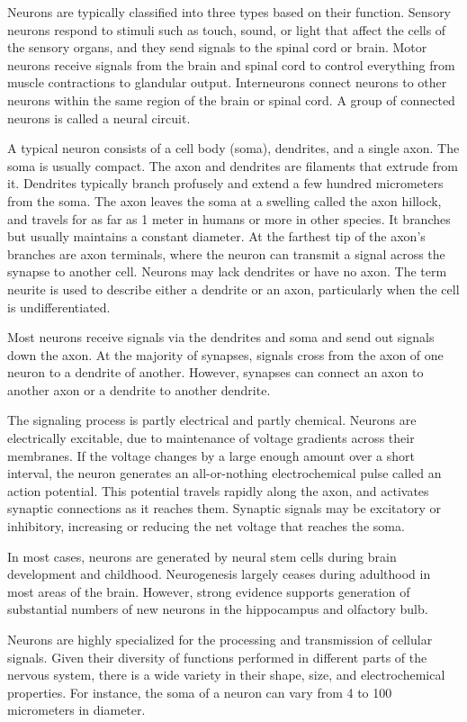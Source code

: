 Neurons are typically classified into three types based on their function. Sensory neurons respond to stimuli such as touch, sound, or light that affect the cells of the sensory organs, and they send signals to the spinal cord or brain. Motor neurons receive signals from the brain and spinal cord to control everything from muscle contractions to glandular output. Interneurons connect neurons to other neurons within the same region of the brain or spinal cord. A group of connected neurons is called a neural circuit.

A typical neuron consists of a cell body (soma), dendrites, and a single axon. The soma is usually compact. The axon and dendrites are filaments that extrude from it. Dendrites typically branch profusely and extend a few hundred micrometers from the soma. The axon leaves the soma at a swelling called the axon hillock, and travels for as far as 1 meter in humans or more in other species. It branches but usually maintains a constant diameter. At the farthest tip of the axon's branches are axon terminals, where the neuron can transmit a signal across the synapse to another cell. Neurons may lack dendrites or have no axon. The term neurite is used to describe either a dendrite or an axon, particularly when the cell is undifferentiated.

Most neurons receive signals via the dendrites and soma and send out signals down the axon. At the majority of synapses, signals cross from the axon of one neuron to a dendrite of another. However, synapses can connect an axon to another axon or a dendrite to another dendrite.

The signaling process is partly electrical and partly chemical. Neurons are electrically excitable, due to maintenance of voltage gradients across their membranes. If the voltage changes by a large enough amount over a short interval, the neuron generates an all-or-nothing electrochemical pulse called an action potential. This potential travels rapidly along the axon, and activates synaptic connections as it reaches them. Synaptic signals may be excitatory or inhibitory, increasing or reducing the net voltage that reaches the soma.

In most cases, neurons are generated by neural stem cells during brain development and childhood. Neurogenesis largely ceases during adulthood in most areas of the brain. However, strong evidence supports generation of substantial numbers of new neurons in the hippocampus and olfactory bulb.

Neurons are highly specialized for the processing and transmission of cellular signals. Given their diversity of functions performed in different parts of the nervous system, there is a wide variety in their shape, size, and electrochemical properties. For instance, the soma of a neuron can vary from 4 to 100 micrometers in diameter.


